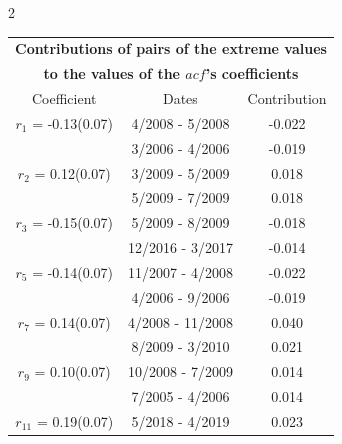 
\thispagestyle{empty}
\begin{multicols}{2}{ 
\begin{tabular}{ccc}
\multicolumn{3}{c}{\textbf{Contributions of pairs of the extreme values} }  \vspace{-.10in}  \\ 
\multicolumn{3}{c}{ \textbf{to the values of the $acf$'s coefficients}} \\ 
\hline 
\hline                  Coefficient  &  Dates &  Contribution \\ 
\hline 
  $r_{ 1}$ = -0.13(0.07) &       4/2008 -  5/2008 &       -0.022    \vspace{-.10in} \\ 
  &        3/2006 -  4/2006 &       -0.019  \vspace{-.02in}   \\ \hline 
    $r_{ 2}$ = 0.12(0.07) &       3/2009 -  5/2009 &        0.018   \vspace{-.10in} \\  
&        5/2009 -  7/2009 &        0.018  \vspace{-.02in} \\ \hline 
  $r_{ 3}$ = -0.15(0.07) &       5/2009 -  8/2009 &       -0.018    \vspace{-.10in} \\ 
  &       12/2016 -  3/2017 &       -0.014  \vspace{-.02in}   \\ \hline 
    $r_{ 5}$ = -0.14(0.07) &      11/2007 -  4/2008 &       -0.022    \vspace{-.10in} \\ 
  &        4/2006 -  9/2006 &       -0.019  \vspace{-.02in}   \\ \hline 
    $r_{ 7}$ = 0.14(0.07) &       4/2008 - 11/2008 &        0.040   \vspace{-.10in} \\  
&        8/2009 -  3/2010 &        0.021  \vspace{-.02in} \\ \hline 
  $r_{ 9}$ = 0.10(0.07) &      10/2008 -  7/2009 &        0.014   \vspace{-.10in} \\  
&        7/2005 -  4/2006 &        0.014  \vspace{-.02in} \\ \hline 
  $r_{11}$ = 0.19(0.07) &       5/2018 -  4/2019 &        0.023   \vspace{-.10in} \\  

\end{tabular}}
\end{multicols}
